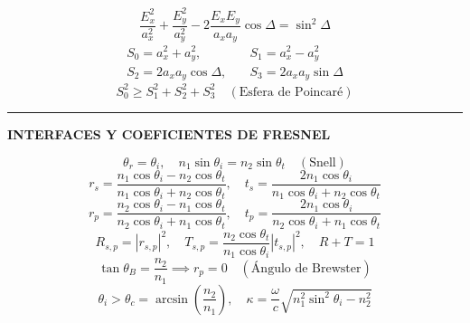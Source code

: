 \documentclass[twocolumn]{article}
\begin{document}
	\begin{equation*}
		\frac{E_x^2}{a_x^2} + \frac{E_y^2}{a_y^2} - 2\frac{E_x E_y}{a_x a_y}\cos\Delta = \sin^2\Delta
	\end{equation*}
	\begin{align*}
		S_0 = a_x^2 + a_y^2, & \quad S_1 = a_x^2 - a_y^2 \\
		S_2 = 2a_x a_y\cos\Delta, & \quad S_3 = 2a_x a_y\sin\Delta
	\end{align*}
	\begin{equation*}
		S_0^2 \geq S_1^2 + S_2^2 + S_3^2 \quad (\text{Esfera de Poincaré})
	\end{equation*}
	
	\vspace{-2mm}\hrule\vspace{1mm}
	
	\begin{center}\textbf{\footnotesize INTERFACES Y COEFICIENTES DE FRESNEL}\end{center}
	\vspace{-2mm}
	\begin{equation*}
		\theta_r = \theta_i, \quad n_1\sin\theta_i = n_2\sin\theta_t \quad (\text{Snell})
	\end{equation*}
	\begin{equation*}
		r_s = \frac{n_1\cos\theta_i - n_2\cos\theta_t}{n_1\cos\theta_i + n_2\cos\theta_t}, \quad t_s = \frac{2n_1\cos\theta_i}{n_1\cos\theta_i + n_2\cos\theta_t}
	\end{equation*}
	\begin{equation*}
		r_p = \frac{n_2\cos\theta_i - n_1\cos\theta_t}{n_2\cos\theta_i + n_1\cos\theta_t}, \quad t_p = \frac{2n_1\cos\theta_i}{n_2\cos\theta_i + n_1\cos\theta_t}
	\end{equation*}
	\begin{equation*}
		R_{s,p} = |r_{s,p}|^2, \quad T_{s,p} = \frac{n_2\cos\theta_t}{n_1\cos\theta_i}|t_{s,p}|^2, \quad R+T=1
	\end{equation*}
	\begin{equation*}
		\tan\theta_B = \frac{n_2}{n_1} \implies r_p = 0 \quad (\text{Ángulo de Brewster})
	\end{equation*}
	\begin{equation*}
		\theta_i > \theta_c = \arcsin\left(\frac{n_2}{n_1}\right), \quad \kappa = \frac{\omega}{c}\sqrt{n_1^2\sin^2\theta_i - n_2^2}
	\end{equation*}
	
\end{document}
